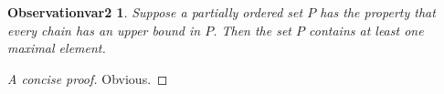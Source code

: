 \newtheorem{observationvar2}[observation]{Observationvar2}
\begin{observationvar2}
  Suppose a partially ordered set $P$ has the property
  that every chain has an upper bound in $P$. Then the
  set $P$ contains at least one maximal element.
\end{observationvar2}
\begin{proof}[A concise proof]
  Obvious.
\end{proof}